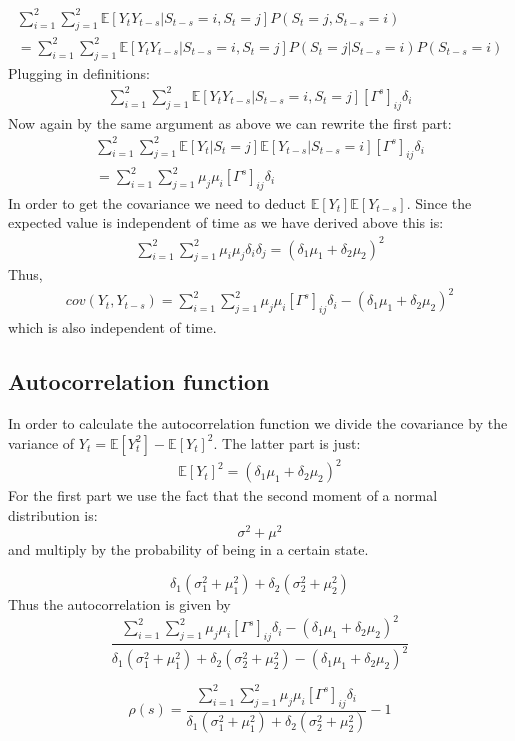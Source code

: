 \documentclass[11pt]{article}
\begin{document}
\begin{align*}
  \label{eq:20}
  \sum_{i=1}^2 \sum_{j=1}^2 \mathbb{E}[Y_tY_{t-s}|S_{t-s} = i, S_t = j] P(S_t=j, S_{t-s} = i)\\
  =   \sum_{i=1}^2 \sum_{j=1}^2 \mathbb{E}[Y_tY_{t-s}|S_{t-s} = i, S_t = j] P(S_t=j| S_{t-s} = i) P(S_{t-s} = i)
\end{align*}
Plugging in definitions:
\begin{align*}
  \sum_{i=1}^2 \sum_{j=1}^2 \mathbb{E}[Y_tY_{t-s}|S_{t-s} = i, S_t = j] [\Gamma^s]_{ij} \delta_i
\end{align*}
Now again by the same argument as above we can rewrite the first part:
\begin{align*}
  \sum_{i=1}^2 \sum_{j=1}^2 \mathbb{E}[Y_t|S_t=j] \mathbb{E}[Y_{t-s}|S_{t-s} = i] [\Gamma^s]_{ij} \delta_i\\
  =   \sum_{i=1}^2 \sum_{j=1}^2 \mu_j \mu_i [\Gamma^s]_{ij} \delta_i
\end{align*}
In order to get the covariance we need to deduct $\mathbb{E}[Y_t]\mathbb{E}[Y_{t-s}]$. Since the expected value is independent of time as we have derived above this is:
\begin{align*}
  \sum_{i=1}^2 \sum_{j=1}^2 \mu_i\mu_j\delta_i\delta_j = (\delta_1\mu_1 + \delta_2 \mu_2)^2
\end{align*}
Thus,
\begin{align}
  cov(Y_t, Y_{t-s})  =   \sum_{i=1}^2 \sum_{j=1}^2 \mu_j \mu_i [\Gamma^s]_{ij} \delta_i - (\delta_1\mu_1 + \delta_2 \mu_2)^2
\end{align}
which is also independent of time.

\subsection{Autocorrelation function}
\label{sec:autoc-funct}

In order to calculate the autocorrelation function we divide the covariance by the variance of $Y_t = \mathbb{E}[Y_t^2] - \mathbb{E}[Y_t]^2$. The latter part is just:
\begin{align}
 \mathbb{E}[Y_t]^2 = (\delta_1\mu_1 + \delta_2 \mu_2)^2
\end{align}
For the first part we use the fact that the second moment of a normal distribution is:
\begin{equation}
  \sigma^2 + \mu^2
\end{equation}
and multiply by the probability of being in a certain state.

\begin{equation}
  \delta_1(\sigma_1^2 + \mu_1^2) + \delta_2(\sigma_2^2 + \mu_2^2)
\end{equation}
Thus the autocorrelation is given by
\begin{equation}
  \frac{\sum_{i=1}^2 \sum_{j=1}^2 \mu_j \mu_i [\Gamma^s]_{ij} \delta_i - (\delta_1\mu_1 + \delta_2 \mu_2)^2}{\delta_1(\sigma_1^2 + \mu_1^2) + \delta_2(\sigma_2^2 + \mu_2^2) - (\delta_1\mu_1 + \delta_2 \mu_2)^2}
\end{equation}

\begin{equation}
\rho(s) =  \frac{\sum_{i=1}^2 \sum_{j=1}^2 \mu_j \mu_i [\Gamma^s]_{ij} \delta_i}{\delta_1(\sigma_1^2 + \mu_1^2) + \delta_2(\sigma_2^2 + \mu_2^2)} -1
\end{equation}


\printbibliography
\end{document}
